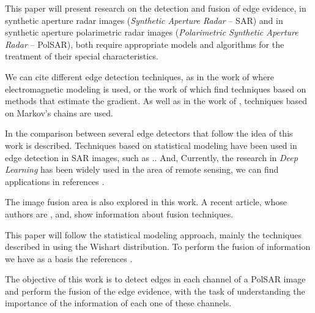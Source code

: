 \documentclass[conference]{IEEEtran}
\begin{document}
This paper will present research on the detection and fusion of edge evidence, in synthetic aperture radar images (\textit{Synthetic Aperture Radar} -- SAR) and in synthetic aperture polarimetric radar images (\textit{Polarimetric Synthetic Aperture Radar} -- PolSAR), both require appropriate models and algorithms for the treatment of their special characteristics.

We can cite different edge detection techniques, as in the work of \cite{slf_2008} where electromagnetic modeling is used, or the work of \cite{tlb, obw, flmc, fyf} which find techniques based on methods that estimate the gradient. As well as in the work of \cite{bf}, techniques based on Markov's chains are used. 

In \cite{gfn} the comparison between several edge detectors that follow the idea of this work is described. Techniques based on statistical modeling have been used in edge detection in SAR images, such as \cite{gmbf, fbgm, horrit, gfn}.. And, Currently, the research in \textit{Deep Learning} has been widely used in the area of remote sensing, we can find applications in references \cite{bac, ztmxzxf, tabmm, xstz}. 

The image fusion area is also explored in this work. 
A recent article, whose authors are \cite{sglmla}, and, \cite{sg} show  information about fusion techniques.  

This paper will follow the statistical modeling approach, mainly the techniques described in \cite{fbgm, nhfc} using the Wishart distribution. To perform the fusion of information we have as a basis the references \cite{mit, sg}. 

The objective of this work is to detect edges in each channel of a PolSAR image and perform the fusion of the edge evidence, with the task of understanding the importance of the information of each one of these channels. 
\end{document}
